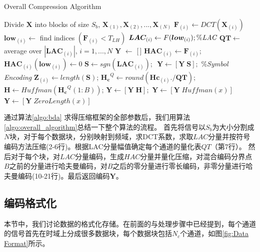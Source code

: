\begin{algorithm}
\caption{Overall Compression Algorithm}
\label{algo:overall_algorithm}
\begin{algorithmic}[1]  
\State Divide $\bm{X}$ into blocks of size $S_b$, $\bm{X}_{(1)},\bm{X}_{(2)},...,\bm{X}_{(N)}$
        \State $\bm{F}_{(i)} \leftarrow DCT(\bm{X}_{(i)})$
        \State $\bm{low}_{(i)}\leftarrow$ find indices $(\bm{F}_{(i)}<T_{LH})$
        \State$\bm{LAC}_{(i)} \leftarrow F(\bm{low}_{(i)});\%\emph{LAC}$
    \EndFor
    \State $\bm{QT}\leftarrow$ average over $|\bm{LAC}_{(i)}|$,\,\,$i=1,...,N$
	\State $\bm{Y}$ $\leftarrow$ [\,]
    \State $\bm{HAC}_{(i)} \leftarrow \bm{F}_{(i)}$; \,\,$\bm{HAC}_{(i)}(\bm{low}_{(i)}) \leftarrow 0$
    \State $\bm{S}\leftarrow sgn(\bm{LAC}_{(i)})$;\,\, $\bm{Y}\leftarrow [\bm{Y}\; \bm{S}];$  \%\emph{Symbol Encoding}
    \State $\bm{Z}_{(i)}\leftarrow length(\bm{S})$; 
    \State $\bm{H_c}^Q\leftarrow round(\bm{Hc}_{(i)}./\bm{QT});$
    \State $\bm{H}\leftarrow Huffman(\bm{H_c}^Q(1:B))$; $\bm{Y} \leftarrow [\bm{Y}\; \bm{H}];$
            	\State $\bm{Y} \leftarrow [\bm{Y}\; Huffman(x)]$
	        \Else
    	        \State $\bm{Y} \leftarrow [\bm{Y}\; ZeroLength(x)]$
    	    \EndIf    	        
        \EndFor
\EndFor
\end{algorithmic}
\end{algorithm}


通过算法\ref{algo:bda} 求得压缩框架的全部参数后，我们用算法\ref{algo:overall_algorithm}总结一下整个算法的流程。 首先将信号以$S_b$为大小分割成$N$块，对于每个数据块，分别映射到频域，求DCT系数，求取$LAC$分量并按符号编码方法压缩(2-6行)。根据LAC分量幅值确定每个通道的量化表$QT$（第7行）。 然后对于每个块，对$LAC$分量编码，生成$HAC$分量并量化压缩，对混合编码分界点$B$之前的分量进行哈夫曼编码，对$B$之后的零分量进行零长编码，非零分量进行哈夫曼编码(10-21行)。最后返回编码$\bm{Y}$。







\subsection{编码格式化}
本节中，我们讨论数据的格式化存储。在前面的与处理步骤中已经提到，每个通道的信号首先在时域上分成很多数据块，每个数据块包括$N_c$个通道，如图\ref{fig:Data Format}所示。

